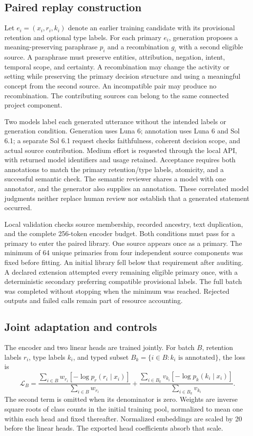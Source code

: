 \subsection{Paired replay construction}
Let $e_i=(x_i,r_i,k_i)$ denote an earlier training candidate with its provisional retention and optional type labels. For each primary $e_i$, generation proposes a meaning-preserving paraphrase $p_i$ and a recombination $g_i$ with a second eligible source. A paraphrase must preserve entities, attribution, negation, intent, temporal scope, and certainty. A recombination may change the activity or setting while preserving the primary decision structure and using a meaningful concept from the second source. An incompatible pair may produce no recombination. The contributing sources can belong to the same connected project component.

Two models label each generated utterance without the intended labels or generation condition. Generation uses Luna 6; annotation uses Luna 6 and Sol 6.1; a separate Sol 6.1 request checks faithfulness, coherent decision scope, and actual source contribution. Medium effort is requested through the local API, with returned model identifiers and usage retained. Acceptance requires both annotations to match the primary retention/type labels, atomicity, and a successful semantic check. The semantic reviewer shares a model with one annotator, and the generator also supplies an annotation. These correlated model judgments neither replace human review nor establish that a generated statement occurred.

Local validation checks source membership, recorded ancestry, text duplication, and the complete 256-token encoder budget. Both conditions must pass for a primary to enter the paired library. One source appears once as a primary. The minimum of 64 unique primaries from four independent source components was fixed before fitting. An initial library fell below that requirement after auditing. A declared extension attempted every remaining eligible primary once, with a deterministic secondary preferring compatible provisional labels. The full batch was completed without stopping when the minimum was reached. Rejected outputs and failed calls remain part of resource accounting.

\subsection{Joint adaptation and controls}
The encoder and two linear heads are trained jointly. For batch $B$, retention labels $r_i$, type labels $k_i$, and typed subset $B_k=\{i\in B:k_i\text{ is annotated}\}$, the loss is
\[
 \mathcal L_B=
 \frac{\sum_{i\in B}w_{r_i}[-\log p_r(r_i\mid x_i)]}
      {\sum_{i\in B}w_{r_i}}
 +\frac{\sum_{i\in B_k}v_{k_i}[-\log p_k(k_i\mid x_i)]}
       {\sum_{i\in B_k}v_{k_i}}.
\]
The second term is omitted when its denominator is zero. Weights are inverse square roots of class counts in the initial training pool, normalized to mean one within each head and fixed thereafter. Normalized embeddings are scaled by 20 before the linear heads. The exported head coefficients absorb that scale.

